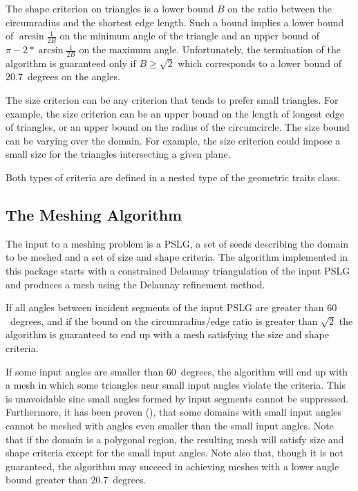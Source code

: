 The shape criterion on triangles is a lower bound $B$ on the ratio
between the circumradius and the shortest edge length.  Such a bound
implies a lower bound of $\arcsin{\frac{1}{2B}}$ on the minimum angle
of the triangle and an upper bound of $\pi - 2* \arcsin{\frac{1}{2B}}$
on the maximum angle.  Unfortunately, the termination of the algorithm
is guaranteed only if $B \ge \sqrt{2}$ which corresponds to a lower
bound of $20.7$~degrees on the angles.

The size criterion can be any criterion that tends to prefer small
triangles. For example, the size criterion can be an upper bound on the
length of longest edge of triangles, or an upper bound on the radius of the
circumcircle. The size bound can be varying over the domain. For example,
the size criterion could impose a small size for the triangles intersecting
a given plane.

Both types of criteria are defined
in a nested type  of the geometric traits class.

\subsection{The Meshing Algorithm}

The input to a meshing problem is a PSLG, a set of seeds
describing the domain to be meshed and a set of size and shape
criteria.  The algorithm implemented in this package starts with a
constrained Delaunay triangulation of the input PSLG and produces a
mesh using the Delaunay refinement method.

If all angles between incident segments of the input PSLG
are greater than $60$~degrees, and if the bound on the
circumradius/edge ratio is greater than $\sqrt{2}$
the algorithm is guaranteed to end up with a mesh
satisfying the size and shape criteria.

If some input angles are smaller than $60$~degrees, the algorithm will
end up with a mesh in which some triangles near small input angles
violate the criteria.  This is unavoidable sinc small angles formed
by input segments cannot be suppressed. Furthermore, it has been
proven (\cite{s-mgdsa-00}), that some domains with small input angles
cannot be meshed with angles even smaller than the small input angles.
Note that if the domain is a polygonal region, the resulting mesh will
satisfy size and shape criteria except for the small input angles.
Note also that, though it is not guaranteed, the algorithm may succeed
in achieving meshes with a lower angle bound greater than
$20.7$~degrees.


